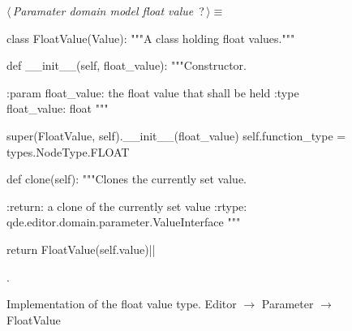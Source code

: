 \documentclass[%
    a4paper,    %
    justified,  %
    nobib,      %
    openany     %
]{tufte-book}
\makeatletter
\renewcommand{\label}[1]{\@tufte@label{##1}}%
\makeatother
\begin{document}
\begin{figure}
\begin{flushleft} \small
\begin{minipage}{\linewidth}\label{scrap132}\raggedright\small
{} $\langle\,${\itshape Paramater domain model float value}\nobreak\ {\footnotesize {?}}$\,\rangle\equiv$
\vspace{-1ex}
\begin{pythoncode}
class FloatValue(Value):
    """A class holding float values."""

    def __init__(self, float_value):
        """Constructor.

        :param float_value: the float value that shall be held
        :type  float_value: float
        """

        super(FloatValue, self).__init__(float_value)
        self.function_type = types.NodeType.FLOAT

    def clone(self):
        """Clones the currently set value.

        :return: a clone of the currently set value
        :rtype:  qde.editor.domain.parameter.ValueInterface
        """

        return FloatValue(self.value)|\NWsep|
\end{pythoncode}
\vspace{1.5ex}
\footnotesize
\begin{list}{}{\setlength{\itemsep}{-\parsep}\setlength{\itemindent}{-\leftmargin}}
\item {\NWtxtMacroNoRef}.

\item{}
\end{list}
\end{minipage}\vspace{4ex}
\end{flushleft}
\caption{Implementation of the float value type.
  \newline{}\newline{}Editor $\rightarrow$ Parameter $\rightarrow$
  FloatValue}
\label{editor:lst:parameter:float-value}
\end{figure}
\end{document}
